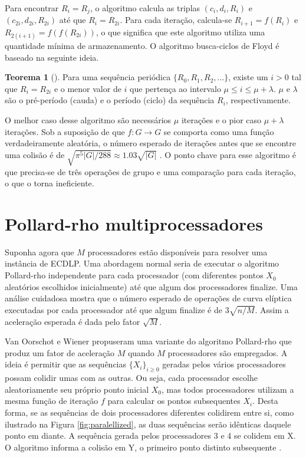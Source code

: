 Para encontrar \(R_i = R_j\), o algoritmo calcula as triplas $(c_i, d_i, R_i)$ e $(c_{2i}, d_{2i}, R_{2i})$ até que \(R_i = R_{2i}\). Para cada iteração, calcula-se \(R_{i+1} = f(R_i)\) e \(R_{2(i+1)} = f(f(R_{2i}))\), o que significa que este algoritmo utiliza uma quantidade mínima de armazenamento. O algoritmo busca-ciclos de Floyd é baseado na seguinte ideia. \cite{Ping:2011} \cite{Brent:2008}

\textbf{Teorema 1} (\cite{Knuth:1997}). Para uma sequência periódica \(\{R_0, R_1, R_2, ...\}\), existe um \(i > 0\) tal que \(R_i = R_{2i}\) e o menor valor de \(i\) que pertença ao intervalo \(\mu \leq i \leq \mu + \lambda\). \(\mu\) e \(\lambda\) são o pré-período (cauda) e o período (ciclo) da sequência \(R_i\), respectivamente.

O melhor caso desse algoritmo são necessários \(\mu\) iterações e o pior caso \(\mu + \lambda\) iterações. Sob a suposição de que \(f : G \to G\) se comporta como uma função verdadeiramente aleatória, o número esperado de iterações antes que se encontre uma colisão é de $\sqrt{\pi^5 |G|/288} \approx 1.03 \sqrt{|G|}$ \cite{Brent:2008}. O ponto chave para esse algoritmo é que precisa-se de três operações de grupo e uma comparação para cada iteração, o que o torna ineficiente.

%
%
\section{Pollard-rho multiprocessadores} \label{sec:parallelized}
Suponha agora que \(M\) processadores estão disponíveis para resolver uma instância de ECDLP. Uma abordagem normal seria de executar o algoritmo Pollard-rho independente para cada processador (com diferentes pontos \(X_0\) aleatórios escolhidos inicialmente) até que algum dos processadores finalize. Uma análise cuidadosa mostra que o número esperado de operações de curva elíptica executadas por cada processador até que algum finalize é de $3\sqrt{n/M}$. Assim a aceleração esperada é dada pelo fator $\sqrt{M}$. \cite{Guide}

Van Oorschot e Wiener propuseram uma variante do algoritmo Pollard-rho que produz um fator de aceleração \(M\) quando \(M\) processadores são empregados. A ideia é permitir que as sequências $\{X_i\}_{i \geq 0}$ geradas pelos vários processadores possam colidir umas com as outras. Ou seja, cada processador escolhe aleatoriamente seu próprio ponto inicial \(X_0\), mas todos processadores utilizam a mesma função de iteração \(f\) para calcular os pontos subsequentes \(X_i\). Desta forma, se as sequências de dois processadores diferentes colidirem entre si, como ilustrado na Figura \ref{fig:paralellized}, as duas sequências serão idênticas daquele ponto em diante. A sequência gerada pelos processadores 3 e 4 se colidem em X. O algoritmo informa a colisão em Y, o primeiro ponto distinto subsequente \cite{Van:1996}.

